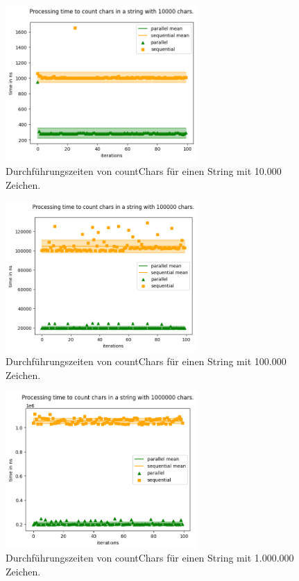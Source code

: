 \documentclass[plainarticle,zihtitle,german,final,hyperref,utf8]{zihpub}
\begin{document}
\begin{figure}[h]
	\begin{center}
		\includegraphics[width=0.65\textwidth]{images/comp_count_10000.png}
		\caption{Durchführungszeiten von countChars für einen String mit 10.000 Zeichen.}
	\end{center}
\end{figure}\label{fig:count_10k}
\newpage
\begin{figure}[h]
	\begin{center}
		\includegraphics[width=0.65\textwidth]{images/comp_count_100000.png}
		\caption{Durchführungszeiten von countChars für einen String mit 100.000 Zeichen.}
	\end{center}
\end{figure}
\newpage
\begin{figure}[h]
	\begin{center}
		\includegraphics[width=0.65\textwidth]{images/comp_count_1000000.png}
		\caption{Durchführungszeiten von countChars für einen String mit 1.000.000 Zeichen.}		
	\end{center}
\end{figure}
\end{document}
